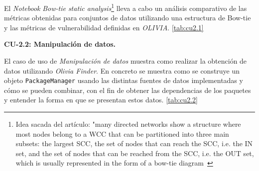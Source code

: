 El \textit{Notebook} \textit{Bow-tie static analysis}\footnote{Idea sacada del artículo:
	"many directed networks show a structure where most nodes belong to a WCC that can be
	partitioned into three main subsets: the largest SCC, the set of nodes that can reach the
	SCC, i.e. the IN set, and the set of nodes that can be reached from the SCC, i.e. the OUT
	set, which is usually represented in the form of a bow-tie diagram~\cite{Broder2000309}} lleva a cabo un análisis comparativo de las
métricas obtenidas para conjuntos de datos utilizando una estructura de Bow-tie\cite{enwiki:1148363387} y
las métricas de vulnerabilidad definidas en \textit{OLIVIA}. \ref{tab:cu2.1}



\textbf{CU-2.2: Manipulación de datos.}

El caso de uso de \textit{Manipulación de datos} muestra como realizar la obtención de datos utilizando \textit{Olivia Finder}.
En concreto se muestra como se construye un objeto \texttt{PackageManager} usando las distintas fuentes de datos implementadas y cómo se pueden combinar, con el fin de obtener las dependencias
de los paquetes y entender la forma en que se presentan estos datos. \ref{tab:cu2.2}

